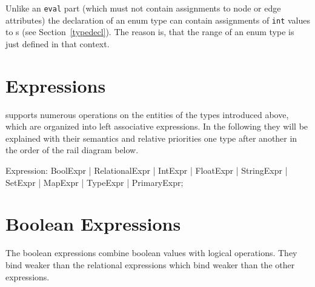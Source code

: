 \begin{note}
	Unlike an {\tt eval} part (which must not contain assignments to node or edge attributes) the declaration of an enum type can contain assignments of {\tt int} values to s (see Section~\ref{typedecl}).
	The reason is, that the range of an enum type is just defined in that context.
\end{note}


\section{Expressions}

\GrG supports numerous operations on the entities of the types introduced above, which are organized into left associative expressions.
In the following they will be explained with their semantics and relative priorities one type after another in the order of the rail diagram below.

\begin{rail}
  Expression: BoolExpr | RelationalExpr | IntExpr | FloatExpr | StringExpr | SetExpr | MapExpr | TypeExpr | PrimaryExpr;  
\end{rail}


\section{Boolean Expressions}

The boolean expressions combine boolean values with logical operations.
They bind weaker than the relational expressions which bind weaker than the other expressions.

